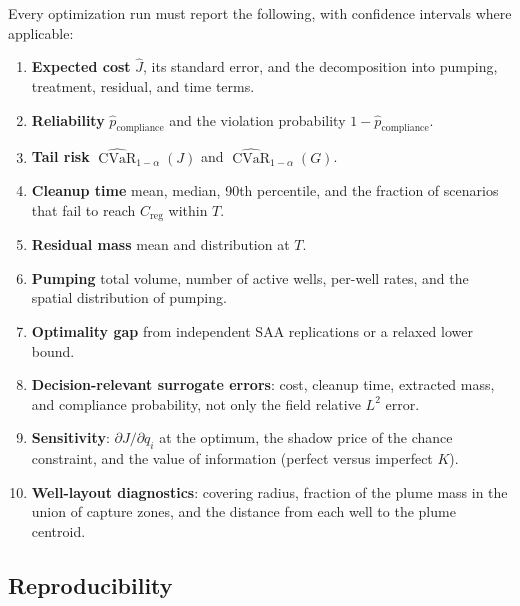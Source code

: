 \documentclass[11pt]{article}
\numberwithin{equation}{section}
\newcommand{\CVaR}{\operatorname{CVaR}}
\theoremstyle{plain}
\begin{document}
Every optimization run must report the following, with confidence intervals
where applicable:
\begin{enumerate}[leftmargin=1.6em,itemsep=2pt]
  \item \textbf{Expected cost} $\hat J$, its standard error, and the
        decomposition into pumping, treatment, residual, and time terms.
  \item \textbf{Reliability} $\hat p_{\mathrm{compliance}}$ and the
        violation probability $1-\hat p_{\mathrm{compliance}}$.
  \item \textbf{Tail risk} $\widehat{\CVaR}_{1-\alpha}(J)$ and
        $\widehat{\CVaR}_{1-\alpha}(G)$.
  \item \textbf{Cleanup time} mean, median, 90th percentile, and the fraction
        of scenarios that fail to reach $C_{\mathrm{reg}}$ within $T$.
  \item \textbf{Residual mass} mean and distribution at $T$.
  \item \textbf{Pumping} total volume, number of active wells, per-well rates,
        and the spatial distribution of pumping.
  \item \textbf{Optimality gap} from independent SAA replications or a
        relaxed lower bound.
  \item \textbf{Decision-relevant surrogate errors}: cost, cleanup time,
        extracted mass, and compliance probability, not only the field
        relative $L^2$ error.
  \item \textbf{Sensitivity}: $\partial J/\partial q_i$ at the optimum, the
        shadow price of the chance constraint, and the value of information
        (perfect versus imperfect $K$).
  \item \textbf{Well-layout diagnostics}: covering radius, fraction of the
        plume mass in the union of capture zones, and the distance from each
        well to the plume centroid.
\end{enumerate}

\subsection{Reproducibility}
\end{document}
